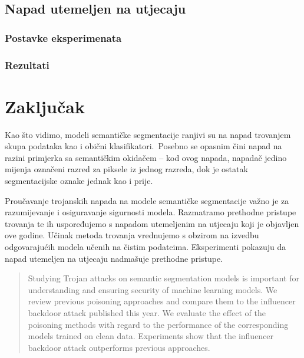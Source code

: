 \documentclass[times, utf8, seminar, numeric]{fer}
\begin{document}
\section{Napad utemeljen na utjecaju}

\subsection{Postavke eksperimenata}

\subsection{Rezultati}

\chapter{Zaključak}

Kao što vidimo, modeli semantičke segmentacije ranjivi su na napad trovanjem skupa podataka kao i obični klasifikatori.\ 
Posebno se opasnim čini napad na razini primjerka sa semantičkim okidačem – kod ovog napada, napadač jedino mijenja označeni razred za piksele iz jednog razreda, dok je ostatak segmentacijske oznake jednak kao i prije.




\begin{sazetak}

    Proučavanje trojanskih napada na modele semantičke segmentacije važno je za razumijevanje i osiguravanje sigurnosti modela. 
    Razmatramo prethodne pristupe trovanja te ih uspoređujemo s napadom utemeljenim na utjecaju koji je objavljen ove godine. 
    Učinak metoda trovanja vrednujemo s obzirom na izvedbu odgovarajućih modela učenih na čistim podatcima. 
    Eksperimenti pokazuju da napad utemeljen na utjecaju nadmašuje prethodne pristupe.
    

\end{sazetak}
    

\begin{abstract}

    Studying Trojan attacks on semantic segmentation models is important for understanding and ensuring security of machine learning models.
    We review previous poisoning approaches and compare them to the influencer backdoor attack published this year.
    We evaluate the effect of the poisoning methods with regard to the performance of the corresponding models trained on clean data.
    Experiments show that the influencer backdoor attack outperforms previous approaches.
    

\end{abstract}
\end{document}

